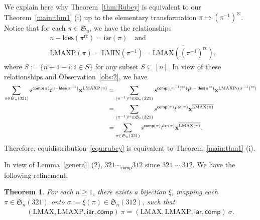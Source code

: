 \documentclass[12pt]{amsart}
\numberwithin{equation}{section}
\theoremstyle{plain}
\newtheorem{theorem}{Theorem}[section]
\theoremstyle{definition}
\def\S{\mathfrak{S}}
\def\iar{\mathsf{iar}}
\def\comp{\mathsf{comp}}
\def\LMAX{\mathrm{LMAX}}
\def\LMAXP{\mathrm{LMAXP}}
\def\LMIN{\mathrm{LMIN}}
\def\ldes{\mathsf{ldes}}
\begin{document}
We explain here why Theorem~\ref{thm:Rubey} is equivalent to our Theorem~\ref{main:thm1} (i) up to the elementary transformation $\pi\mapsto (\pi^{-1})^{\mathrm{rc}}$. Notice that for each $\pi\in\S_n$, we have the relationships 
\begin{align*}
&n-\ldes(\pi^{\mathrm{rc}})=\iar(\pi)\quad\text{and}\\
&\LMAXP(\pi)=\LMIN(\pi^{-1})=\overline{\LMAX((\pi^{-1})^{\mathrm{rc}})},
\end{align*}
where $\bar{S}:=\{n+1-i: i\in S\}$ for any subset $S\subseteq[n]$. In view of these relationships and Observation~\ref{obs:2}, we have 
\begin{align*}
\sum_{\pi\in\S_n(321)}s^{\comp(\pi)}t^{n-\ldes(\pi^{-1})}{\bf x}^{\LMAXP(\pi)}&=\sum_{(\pi^{-1})^{\mathrm{rc}}\in\S_n(321)}s^{\comp((\pi^{-1})^{\mathrm{rc}})}t^{n-\ldes(\pi^{\mathrm{rc}})}{\bf x}^{\LMAXP((\pi^{-1})^{\mathrm{rc}})}\\
&=\sum_{(\pi^{-1})^{\mathrm{rc}}\in\S_n(321)}s^{\comp(\pi)}t^{\iar(\pi)}{\bf x}^{\overline{\LMAX(\pi)}}\\
&=\sum_{\pi\in\S_n(321)}s^{\comp(\pi)}t^{\iar(\pi)}{\bf x}^{\overline{\LMAX(\pi)}}.
\end{align*}
Therefore, equidistribution~\eqref{equ:rubey} is equivalent to Theorem~\ref{main:thm1} (i). 

In view of Lemma~\ref{general} (2), $321\sim_{\comp}312$ since $321\sim 312$. We have the following refinement.
\begin{theorem}\label{thm:321=312}
For each $n\ge 1$, there exists a bijection $\xi$, mapping each $\pi\in\S_n(321)$ onto $\sigma:=\xi(\pi)\in\S_n(312)$, such that
\begin{align}\label{eq:321=312}
(\LMAX,\LMAXP,\iar,\comp)\:\pi = (\LMAX,\LMAXP,\iar,\comp)\:\sigma.
\end{align}
\end{theorem}
\end{document}
